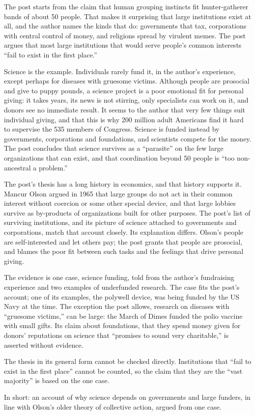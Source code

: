 \begin{afterword}
\summaryhead

The post starts from the claim that human grouping instincts fit hunter-gatherer bands of about 50 people. That makes it surprising that large institutions exist at all, and the author names the kinds that do: governments that tax, corporations with central control of money, and religions spread by virulent memes. The post argues that most large institutions that would serve people's common interests ``fail to exist in the first place.''

Science is the example. Individuals rarely fund it, in the author's experience, except perhaps for diseases with gruesome victims. Although people are prosocial and give to puppy pounds, a science project is a poor emotional fit for personal giving: it takes years, its news is not stirring, only specialists can work on it, and donors see no immediate result. It seems to the author that very few things suit individual giving, and that this is why 200 million adult Americans find it hard to supervise the 535 members of Congress. Science is funded instead by governments, corporations and foundations, and scientists compete for the money. The post concludes that science survives as a ``parasite'' on the few large organizations that can exist, and that coordination beyond 50 people is ``too non-ancestral a problem.''

\responsehead

The post's thesis has a long history in economics, and that history supports it. Mancur Olson argued in 1965 that large groups do not act in their common interest without coercion or some other special device, and that large lobbies survive as by-products of organizations built for other purposes. The post's list of surviving institutions, and its picture of science attached to governments and corporations, match that account closely. Its explanation differs. Olson's people are self-interested and let others pay; the post grants that people are prosocial, and blames the poor fit between such tasks and the feelings that drive personal giving.

The evidence is one case, science funding, told from the author's fundraising experience and two examples of underfunded research. The case fits the post's account; one of its examples, the polywell device, was being funded by the US Navy at the time. The exception the post allows, research on diseases with ``gruesome victims,'' can be large: the March of Dimes funded the polio vaccine with small gifts. Its claim about foundations, that they spend money given for donors' reputations on science that ``promises to sound very charitable,'' is asserted without evidence.

The thesis in its general form cannot be checked directly. Institutions that ``fail to exist in the first place'' cannot be counted, so the claim that they are the ``vast majority'' is based on the one case.

In short: an account of why science depends on governments and large funders, in line with Olson's older theory of collective action, argued from one case.
\end{afterword}
